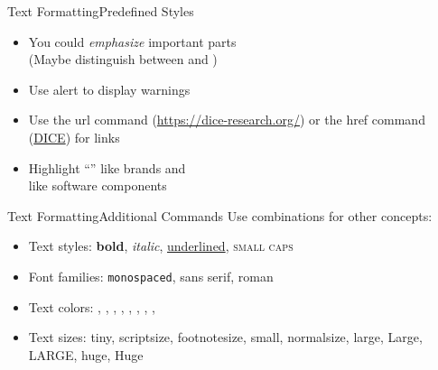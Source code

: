 \documentclass{beamer}
\begin{document}
\begin{frame}{Text Formatting}{Predefined Styles}
	\begin{itemize}
		\item You could \emph{emphasize} important parts \\(Maybe distinguish between  and )
		\item Use alert to display \alert{warnings}
		\item Use the url command (\url{https://dice-research.org/}) or the href command (\href{https://dice-research.org/}{DICE}) for links
		\item Highlight ``'' like brands and\\  like software components
	\end{itemize}
\end{frame}

\begin{frame}{Text Formatting}{Additional Commands}
	Use combinations for other concepts:
	\begin{itemize}
		\item Text styles: \textbf{bold}, \textit{italic}, \underline{underlined}, \textsc{small caps}
		\item Font families: \texttt{monospaced}, \textsf{sans serif}, \textrm{roman}
		\item Text colors:
			,
			,
			,
			,
			,
			,
			,
			,
		\item Text sizes: {\tiny tiny}, {\scriptsize scriptsize}, {\footnotesize footnotesize}, {\small small}, {\normalsize normalsize}, {\large large}, {\Large Large}, {\LARGE LARGE}, {\huge huge}, {\Huge Huge}
	\end{itemize}
\end{frame}
\end{document}
